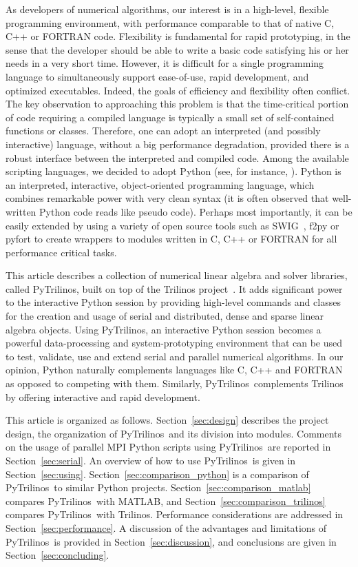 \documentclass[acmtocl]{acmtrans2m}
\newcommand{\PyTrilinos}{{PyTrilinos}}
\begin{document}
As developers of numerical algorithms, our interest is in a
high-level, flexible programming environment, with performance
comparable to that of native C, C++ or FORTRAN code.  Flexibility is
fundamental for rapid prototyping, in the sense that the developer
should be able to write a basic code satisfying his or her needs in a
very short time.  However, it is difficult for a single programming
language to simultaneously support ease-of-use, rapid development, and
optimized executables.  Indeed, the goals of efficiency and
flexibility often conflict.  The key observation to approaching this
problem is that the time-critical portion of code requiring a compiled
language is typically a small set of self-contained functions or
classes.  Therefore, one can adopt an interpreted (and possibly
interactive) language, without a big performance degradation, provided
there is a robust interface between the interpreted and compiled code.
Among the available scripting languages, we decided to adopt Python
(see, for instance, \cite{python-book}).  Python is an interpreted,
interactive, object-oriented programming language, which combines
remarkable power with very clean syntax (it is often observed that
well-written Python code reads like pseudo code).  Perhaps most
importantly, it can be easily extended by using a variety of open
source tools such as SWIG~\cite{swig}, f2py or pyfort to create
wrappers to modules written in C, C++ or FORTRAN for all performance
critical tasks.

This article describes a collection of numerical linear algebra and
solver libraries, called \PyTrilinos, built on top of the Trilinos
project~\cite{Trilinos-home-page,Heroux:2005:OTP}.  It adds
significant power to the interactive Python session by providing
high-level commands and classes for the creation and usage of serial
and distributed, dense and sparse linear algebra objects.  Using
\PyTrilinos, an interactive Python session becomes a powerful
data-processing and system-prototyping environment that can be used to
test, validate, use and extend serial and parallel numerical
algorithms.  In our opinion, Python naturally complements languages
like C, C++ and FORTRAN as opposed to competing with them.  Similarly,
\PyTrilinos\ complements Trilinos by offering interactive and rapid
development.

\smallskip

This article is organized as follows.  Section~\ref{sec:design}
describes the project design, the organization of \PyTrilinos\ and
its division into modules.  Comments on the usage of parallel MPI
Python scripts using \PyTrilinos\ are reported in
Section~\ref{sec:serial}. An overview of how to use \PyTrilinos\ is
given in Section~\ref{sec:using}.
Section~\ref{sec:comparison_python} is a comparison of \PyTrilinos\
to similar Python projects. Section~\ref{sec:comparison_matlab}
compares \PyTrilinos\ with MATLAB, and
Section~\ref{sec:comparison_trilinos} compares \PyTrilinos\ with
Trilinos.  Performance considerations are addressed in
Section~\ref{sec:performance}.  A discussion of the advantages and
limitations of \PyTrilinos\ is provided in
Section~\ref{sec:discussion}, and conclusions are given in
Section~\ref{sec:concluding}.
\end{document}

